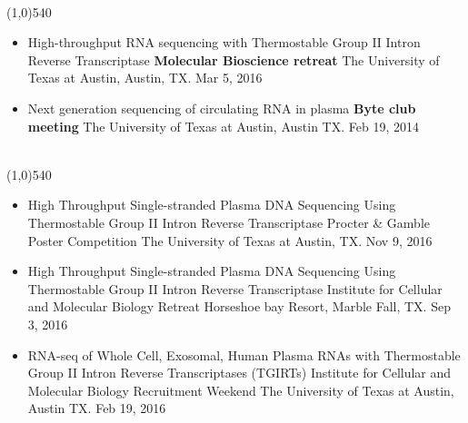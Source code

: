 \documentclass[dvips,11pt]{article}
\begin{document}
 \vspace{-1.5mm}
\\\noindent
\line(1,0){540}\\
\vspace{-6mm}
\begin{itemize}
	\setlength{\itemsep}{0pt}
	\item High-throughput RNA sequencing with Thermostable Group II Intron Reverse Transcriptase \newline
		{\bf Molecular Bioscience retreat} \newline
		The University of Texas at Austin, Austin, TX. Mar 5, 2016
	\item Next generation sequencing of circulating RNA in plasma \newline
		{\bf Byte club meeting} \newline
		The University of Texas at Austin, Austin TX. Feb 19, 2014
\end{itemize}

 \vspace{-1.5mm}
\\\noindent
\line(1,0){540}\\
\vspace{-6mm}
\begin{itemize}
	\setlength{\itemsep}{0pt}
	\item High Throughput Single-stranded Plasma DNA Sequencing Using Thermostable Group II Intron Reverse Transcriptase \newline
	 	Procter \& Gamble Poster Competition \newline
		The University of Texas at Austin, TX. Nov 9, 2016
	\item High Throughput Single-stranded Plasma DNA Sequencing Using Thermostable Group II Intron Reverse Transcriptase \newline
		Institute for Cellular and Molecular Biology Retreat \newline
		Horseshoe bay Resort, Marble Fall, TX. Sep 3, 2016
	\item RNA-seq of Whole Cell, Exosomal, Human Plasma RNAs with Thermostable Group II Intron Reverse Transcriptases (TGIRTs) \newline
		Institute for Cellular and Molecular Biology Recruitment Weekend \newline
		The University of Texas at Austin, Austin TX. Feb 19, 2016
\end{itemize}
\end{document}
